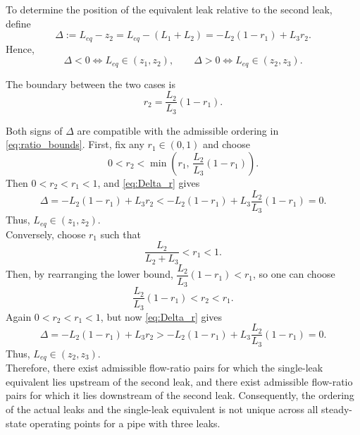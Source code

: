 To determine the position of the equivalent leak relative to the second leak, define
\begin{equation}
\label{eq:Delta_r}
\Delta
:=
L_{eq}-z_2
=
L_{eq}-(L_1+L_2)
=
-L_2(1-r_1)+L_3r_2.
\end{equation}
Hence,
\begin{equation*}
\Delta<0
\iff
L_{eq}\in(z_1,z_2),
\qquad
\Delta>0
\iff
L_{eq}\in(z_2,z_3).
\end{equation*}

The boundary between the two cases is
\begin{equation*}
r_2
=
\dfrac{L_2}{L_3}(1-r_1).
\end{equation*}

Both signs of $\Delta$ are compatible with the admissible ordering in \cref{eq:ratio_bounds}. First, fix any $r_1\in(0,1)$ and choose
\begin{equation*}
0<r_2<
\min\left(
r_1,\,
\dfrac{L_2}{L_3}(1-r_1)
\right).
\end{equation*}
Then $0<r_2<r_1<1$, and \cref{eq:Delta_r} gives
\begin{equation*}
\Delta
=
-L_2(1-r_1)+L_3r_2
<
-L_2(1-r_1)+L_3\dfrac{L_2}{L_3}(1-r_1)
=
0.
\end{equation*}
Thus, $L_{eq}\in(z_1,z_2)$.\\

Conversely, choose $r_1$ such that
\begin{equation*}
\dfrac{L_2}{L_2+L_3}<r_1<1.
\end{equation*}
Then, by rearranging the lower bound, $\dfrac{L_2}{L_3}(1-r_1)<r_1$, so one can choose
\begin{equation*}
\dfrac{L_2}{L_3}(1-r_1)<r_2<r_1.
\end{equation*}
Again $0<r_2<r_1<1$, but now \cref{eq:Delta_r} gives
\begin{equation*}
\Delta
=
-L_2(1-r_1)+L_3r_2
>
-L_2(1-r_1)+L_3\dfrac{L_2}{L_3}(1-r_1)
=
0.
\end{equation*}
Thus, $L_{eq}\in(z_2,z_3)$.\\

Therefore, there exist admissible flow-ratio pairs for which the single-leak equivalent lies upstream of the second leak, and there exist admissible flow-ratio pairs for which it lies downstream of the second leak. Consequently, the ordering of the actual leaks and the single-leak equivalent is not unique across all steady-state operating points for a pipe with three leaks.

\begin{center}
    \noindent{}
\end{center}

